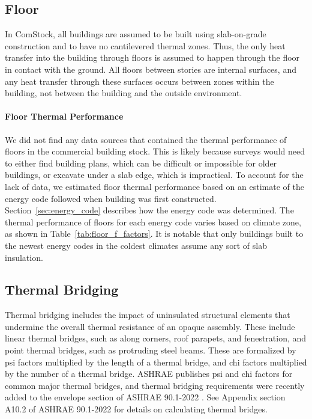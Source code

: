 \subsection{Floor}
In ComStock, all buildings are assumed to be built using slab-on-grade construction and to have no cantilevered thermal zones. Thus, the only heat transfer into the building through floors is assumed to happen through the floor in contact with the ground. All floors between stories are internal surfaces, and any heat transfer through these surfaces occurs between zones within the building, not between the building and the outside environment.

\paragraph{Floor Thermal Performance}
We did not find any data sources that contained the thermal performance of floors in the commercial building stock. This is likely because surveys would need to either find building plans, which can be difficult or impossible for older buildings, or excavate under a slab edge, which is impractical. To account for the lack of data, we estimated floor thermal performance based on an estimate of the energy code followed when building was first constructed. Section~\ref{sec:energy_code} describes how the energy code was determined. The thermal performance of floors for each energy code varies based on climate zone, as shown in Table~\ref{tab:floor_f_factors}. It is notable that only buildings built to the newest energy codes in the coldest climates assume any sort of slab insulation.

\subsection{Thermal Bridging} %
Thermal bridging includes the impact of uninsulated structural elements that undermine the overall thermal resistance of an opaque assembly. These include linear thermal bridges, such as along corners, roof parapets, and fenestration, and point thermal bridges, such as protruding steel beams. These are formalized by psi factors multiplied by the length of a thermal bridge, and chi factors multiplied by the number of a thermal bridge. ASHRAE publishes psi and chi factors for common major thermal bridges, and thermal bridging requirements were recently added to the envelope section of ASHRAE 90.1-2022 \citep{ashrae_901_2022}. See Appendix section A10.2 of ASHRAE 90.1-2022 for details on calculating thermal bridges.


